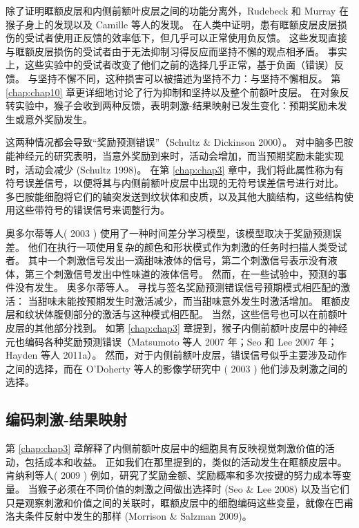 除了证明眶额皮层和内侧前额叶皮层之间的功能分离外，Rudebeck 和 Murray 在猴子身上的发现以及 Camille 等人的发现。
在人类中证明，患有眶额皮层皮层损伤的受试者使用正反馈的效率低下，但几乎可以正常使用负反馈。
这些发现直接与眶额皮层损伤的受试者由于无法抑制习得反应而坚持不懈的观点相矛盾。
事实上，这些实验中的受试者改变了他们之前的选择几乎正常，基于负面（错误）反馈。
与坚持不懈不同，这种损害可以被描述为坚持不力：与坚持不懈相反。
第 \ref{chap:chap10} 章更详细地讨论了行为抑制和坚持以及整个前额叶皮层。
在对象反转实验中，猴子会收到两种反馈，表明刺激-结果映射已发生变化：预期奖励未发生或意外奖励发生。\par
这两种情况都会导致“奖励预测错误”（Schultz \& Dickinson 2000）。
对中脑多巴胺能神经元的研究表明，当意外奖励到来时，活动会增加，而当预期奖励未能实现时，活动会减少 (Schultz 1998)。
在第 \ref{chap:chap3} 章中，我们将此属性称为有符号误差信号，以便将其与内侧前额叶皮层中出现的无符号误差信号进行对比。
多巴胺能细胞将它们的轴突发送到纹状体和皮质，以及其他大脑结构，这些结构使用这些带符号的错误信号来调整行为。\par


奥多尔蒂等人( 2003 ) 使用了一种时间差分学习模型，该模型取决于奖励预测误差。
他们在执行一项使用复杂的颜色和形状模式作为刺激的任务时扫描人类受试者。
其中一个刺激信号发出一滴甜味液体的信号，第二个刺激信号表示没有液体，第三个刺激信号发出中性味道的液体信号。
然而，在一些试验中，预测的事件没有发生。
奥多尔蒂等人。 寻找与签名奖励预测错误信号预期模式相匹配的激活：
当甜味未能按预期发生时激活减少，而当甜味意外发生时激活增加。
眶额皮层和纹状体腹侧部分的激活与这种模式相匹配。
当然，这些信号也可以在前额叶皮层的其他部分找到。 如第 \ref{chap:chap3} 章提到，猴子内侧前额叶皮层中的神经元也编码各种奖励预测错误（Matsumoto 等人 2007 年；Seo 和 Lee 2007 年；Hayden 等人 2011a）。
然而，对于内侧前额叶皮层，错误信号似乎主要涉及动作之间的选择，而在 O'Doherty 等人的影像学研究中 ( 2003 ) 他们涉及刺激之间的选择。\par



\subsection{编码刺激-结果映射}

第 \ref{chap:chap3} 章解释了内侧前额叶皮层中的细胞具有反映视觉刺激价值的活动，包括成本和收益。
正如我们在那里提到的，类似的活动发生在眶额皮层中。 
肯纳利等人( 2009 ) 例如，研究了奖励金额、奖励概率和多次按键的努力成本等变量。
当猴子必须在不同价值的刺激之间做出选择时 (Seo \& Lee 2008) 以及当它们只是观察刺激和价值之间的关联时，眶额皮层中的细胞编码这些变量，就像在巴甫洛夫条件反射中发生的那样 (Morrison \& Salzman 2009)。\par


